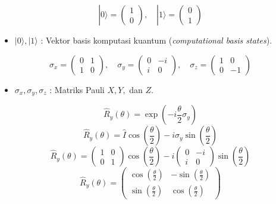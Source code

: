 \begin{equation}
    |0\rangle = \begin{pmatrix} 1 \\ 0 \end{pmatrix}, \quad |1\rangle = \begin{pmatrix} 0 \\ 1 \end{pmatrix}
\end{equation}
\begin{itemize}
    \item $|0\rangle, |1\rangle$ : Vektor basis komputasi kuantum (\textit{computational basis states}).
\end{itemize}

\begin{equation}
    \sigma_x = \begin{pmatrix} 0 & 1 \\ 1 & 0 \end{pmatrix}, \quad \sigma_y = \begin{pmatrix} 0 & -i \\ i & 0 \end{pmatrix}, \quad \sigma_z = \begin{pmatrix} 1 & 0 \\ 0 & -1 \end{pmatrix}
\end{equation}
\begin{itemize}
    \item $\sigma_x, \sigma_y, \sigma_z$ : Matriks Pauli $X, Y,$ dan $Z$.
\end{itemize}

\begin{equation}
    \hat{R}_y(\theta) = \exp\left(-i \frac{\theta}{2} \sigma_y\right)
\end{equation}
\begin{equation}
    \hat{R}_y(\theta) = \hat{I} \cos\left(\frac{\theta}{2}\right) - i \sigma_y \sin\left(\frac{\theta}{2}\right)
\end{equation}
\begin{equation}
    \hat{R}_y(\theta) = \begin{pmatrix} 1 & 0 \\ 0 & 1 \end{pmatrix} \cos\left(\frac{\theta}{2}\right) - i \begin{pmatrix} 0 & -i \\ i & 0 \end{pmatrix} \sin\left(\frac{\theta}{2}\right)
\end{equation}
\begin{equation}
    \hat{R}_y(\theta) = \begin{pmatrix} \cos\left(\frac{\theta}{2}\right) & -\sin\left(\frac{\theta}{2}\right) \\ \sin\left(\frac{\theta}{2}\right) & \cos\left(\frac{\theta}{2}\right) \end{pmatrix}
\end{equation}

